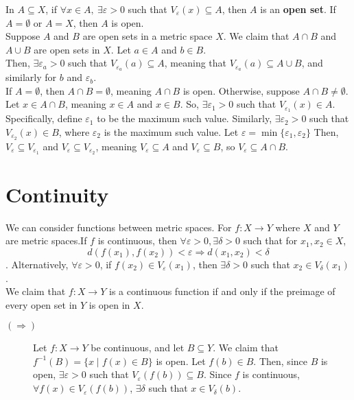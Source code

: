 \documentclass[12pt]{extarticle}
\begin{document}
  In $A\subseteq X$, if $\forall x\in A,~\exists \varepsilon > 0$ such that $V_{\varepsilon}(x)\subseteq A$, then $A$ is an \textbf{open set}. If $A = \emptyset$ or $A = X$, then $A$ is open.\\

  Suppose $A$ and $B$ are open sets in a metric space $X$. We claim that $A\cap B$ and $A\cup B$ are open sets in $X$. Let $a\in A$ and $b\in B$.\\

  Then, $\exists \varepsilon_a>0$ such that $V_{\varepsilon_a}(a)\subseteq A$, meaning that $V_{\varepsilon_a}(a)\subseteq A\cup B$, and similarly for $b$ and $\varepsilon_b$.\\

  If $A = \emptyset$, then $A\cap B = \emptyset$, meaning $A\cap B$ is open. Otherwise, suppose $A\cap B \neq \emptyset$. Let $x\in A\cap B$, meaning $x\in A$ and $x\in B$. So, $\exists \varepsilon_1>0$ such that $V_{\varepsilon_1}(x)\in A$.\\

  Specifically, define $\varepsilon_1$ to be the maximum such value. Similarly, $\exists \varepsilon_2 > 0$ such that $V_{\varepsilon_2}(x)\in B$, where $\varepsilon_2$ is the maximum such value. Let $\varepsilon = \min\{\varepsilon_1,\varepsilon_2\}$ Then, $V_{\varepsilon} \subseteq V_{\varepsilon_1}$ and $V_{\varepsilon} \subseteq V_{\varepsilon_2}$, meaning $V_{\varepsilon} \subseteq A$ and $V_{\varepsilon}\subseteq B$, so $V_{\varepsilon} \subseteq A\cap B$.
  \section*{Continuity}%
  We can consider functions between metric spaces. For $f: X \rightarrow Y$ where $X$ and $Y$ are metric spaces.If $f$ is continuous, then $\forall \varepsilon > 0, \exists \delta > 0$ such that for $x_1,x_2\in X$,\[d(f(x_1),f(x_2)) < \varepsilon \Rightarrow d(x_1,x_2) < \delta\]. Alternatively, $\forall\varepsilon > 0$, if $f(x_2)\in V_{\varepsilon}(x_1)$, then $\exists \delta > 0$ such that $x_2\in V_{\delta}(x_1)$.\\

  We claim that $f:X\rightarrow Y$ is a continuous function if and only if the preimage of every open set in $Y$ is open in $X$.
  \begin{description}
    \item[$(\Rightarrow)$] Let $f: X\rightarrow Y$ be continuous, and let $B\subseteq Y$. We claim that $f^{-1}(B) = \{x\mid f(x) \in B\}$ is open. Let $f(b)\in B$. Then, since $B$ is open, $\exists \varepsilon > 0$ such that $V_{\varepsilon}(f(b)) \subseteq B$. Since $f$ is continuous, $\forall f(x)\in V_{\varepsilon}(f(b))$, $\exists \delta$ such that $x\in V_{\delta}(b)$. 
  \end{description}
\end{document}
